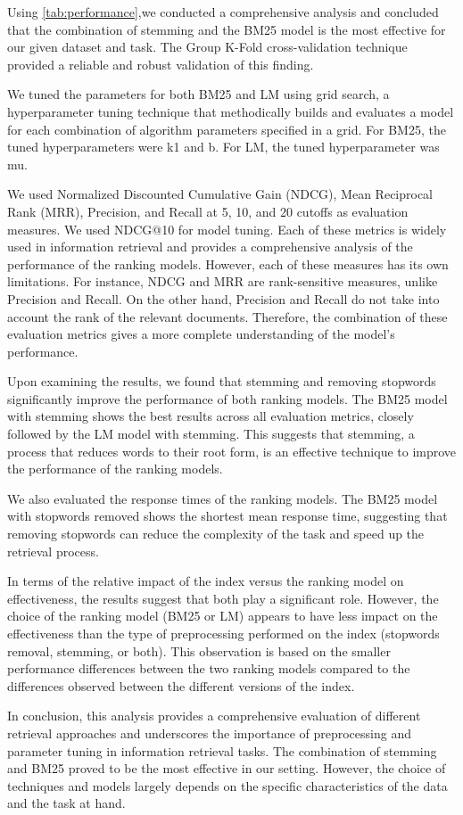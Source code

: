 \documentclass[11pt,a4paper]{article}
\begin{document}
Using \ref{tab:performance},we conducted a comprehensive analysis and concluded that the
combination of stemming and the BM25 model is the most effective for
our given dataset and task. The Group K-Fold cross-validation
technique provided a reliable and robust validation of this finding.

We tuned the parameters for both BM25 and LM using grid search, a
hyperparameter tuning technique that methodically builds and
evaluates a model for each combination of algorithm parameters
specified in a grid. For BM25, the tuned hyperparameters were k1 and
b. For LM, the tuned hyperparameter was mu.

We used Normalized Discounted Cumulative Gain (NDCG), Mean Reciprocal
Rank (MRR), Precision, and Recall at 5, 10, and 20 cutoffs as
evaluation measures. We used NDCG@10 for model tuning. Each of these
metrics is widely used in information retrieval and provides a
comprehensive analysis of the performance of the ranking models.
However, each of these measures has its own limitations. For
instance, NDCG and MRR are rank-sensitive measures, unlike Precision
and Recall. On the other hand, Precision and Recall do not take into
account the rank of the relevant documents. Therefore, the
combination of these evaluation metrics gives a more complete
understanding of the model's performance.

Upon examining the results, we found that stemming and removing
stopwords significantly improve the performance of both ranking
models. The BM25 model with stemming shows the best results across
all evaluation metrics, closely followed by the LM model with
stemming. This suggests that stemming, a process that reduces words
to their root form, is an effective technique to improve the
performance of the ranking models.

We also evaluated the response times of the ranking models. The BM25
model with stopwords removed shows the shortest mean response time,
suggesting that removing stopwords can reduce the complexity of the
task and speed up the retrieval process.

In terms of the relative impact of the index versus the ranking model
on effectiveness, the results suggest that both play a significant
role. However, the choice of the ranking model (BM25 or LM) appears
to have less impact on the effectiveness than the type of
preprocessing performed on the index (stopwords removal, stemming, or
both). This observation is based on the smaller performance
differences between the two ranking models compared to the
differences observed between the different versions of the index.

In conclusion, this analysis provides a comprehensive evaluation of
different retrieval approaches and underscores the importance of
preprocessing and parameter tuning in information retrieval tasks.
The combination of stemming and BM25 proved to be the most effective
in our setting. However, the choice of techniques and models largely
depends on the specific characteristics of the data and the task at
hand.
\end{document}
